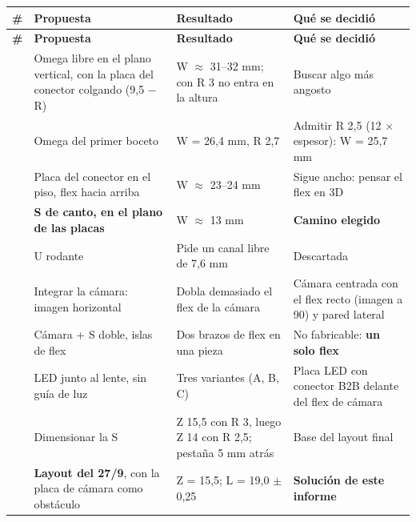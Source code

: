 \documentclass[11pt,a4paper]{article}
\begin{document}
\begingroup\footnotesize
\setlength{\tabcolsep}{4pt}
\setlength{\emergencystretch}{4em}
 
\begin{longtable}{@{}>{\RaggedRight\arraybackslash}p{}>{\RaggedRight\arraybackslash}p{}>{\RaggedRight\arraybackslash}p{}>{\RaggedRight\arraybackslash}p{}@{}}
\toprule
\scriptsize\textbf{\#} & \scriptsize\textbf{Propuesta} & \scriptsize\textbf{Resultado} & \scriptsize\textbf{Qué se decidió} \\
\midrule
\endfirsthead
\toprule
\scriptsize\textbf{\#} & \scriptsize\textbf{Propuesta} & \scriptsize\textbf{Resultado} & \scriptsize\textbf{Qué se decidió} \\
\midrule
\endhead
\bottomrule
\endfoot
1 & Omega libre en el plano vertical, con la placa del conector colgando (9,5 $-$ R) & W $\approx$ 31–32 mm; con R 3 no entra en la altura & Buscar algo más angosto \\
2 & Omega del primer boceto & W = 26,4 mm, R 2,7 & Admitir R 2,5 (12 $\times$ espesor): W = 25,7 mm \\
3 & Placa del conector en el piso, flex hacia arriba & W $\approx$ 23–24 mm & Sigue ancho: pensar el flex en 3D \\
4 & \textbf{S de canto, en el plano de las placas} & W $\approx$ 13 mm & \textbf{Camino elegido} \\
5 & U rodante & Pide un canal libre de 7,6 mm & Descartada \\
6 & Integrar la cámara: imagen horizontal & Dobla demasiado el flex de la cámara & Cámara centrada con el flex recto (imagen a 90\textdegree{}) y pared lateral \\
7 & Cámara + S doble, islas de flex & Dos brazos de flex en una pieza & No fabricable: \textbf{un solo flex} \\
8 & LED junto al lente, sin guía de luz & Tres variantes (A, B, C) & Placa LED con conector B2B delante del flex de cámara \\
9 & Dimensionar la S & Z 15,5 con R 3, luego Z 14 con R 2,5; pestaña 5 mm atrás & Base del layout final \\
10 & \textbf{Layout del 27/9}, con la placa de cámara como obstáculo & Z = 15,5; L = 19,0 $\pm$ 0,25 & \textbf{Solución de este informe} \\
\end{longtable}
\endgroup
\end{document}
